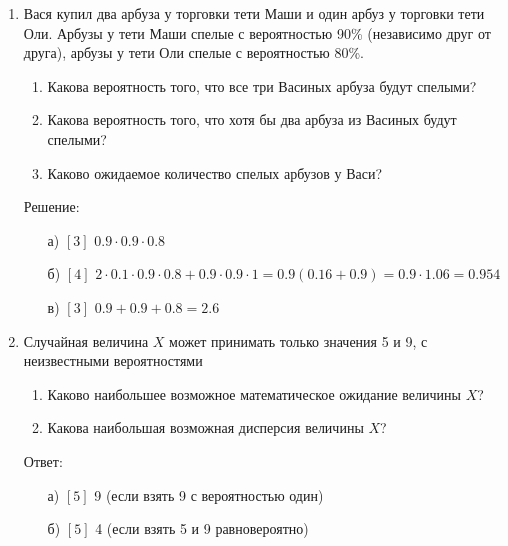 \documentclass[12pt, a4paper]{article}\usepackage[]{graphicx}\usepackage[]{color}
\begin{document}
\begin{enumerate}
\item Вася купил два арбуза у торговки тети Маши и один арбуз у торговки тети Оли. Арбузы у тети Маши спелые с вероятностью 90\% (независимо друг от друга), арбузы у тети Оли спелые с вероятностью 80\%.
\begin{enumerate}
\item Какова вероятность того, что все три Васиных арбуза будут спелыми?
\item Какова вероятность того, что хотя бы два арбуза из Васиных будут спелыми?
\item Каково ожидаемое количество спелых арбузов у Васи?
\end{enumerate}

Решение:
\begin{enumerate}
\item[а)] $[3]$ $0.9\cdot 0.9\cdot 0.8$
\item[б)] $[4]$ $2\cdot 0.1\cdot 0.9\cdot 0.8+0.9\cdot 0.9\cdot 1=0.9(0.16+0.9)=0.9\cdot 1.06=0.954$
\item[в)] $[3]$ $0.9+0.9+0.8=2.6$
\end{enumerate}

\item Случайная величина $X$ может принимать только значения 5 и 9, с неизвестными вероятностями
\begin{enumerate}
\item Каково наибольшее возможное математическое ожидание величины $X$?
\item Какова наибольшая возможная дисперсия величины $X$?
\end{enumerate}
Ответ:
\begin{enumerate}
\item[а)] $[5]$ 9 (если взять 9 с вероятностью один)
\item[б)] $[5]$ 4 (если взять 5 и 9 равновероятно)
\end{enumerate}






\end{enumerate}
\end{document}
